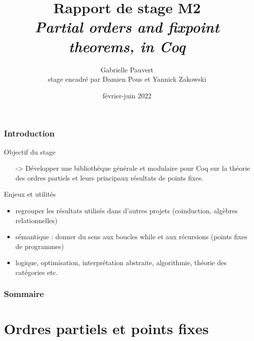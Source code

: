 \documentclass{beamer}
\title[\textit{Partial orders and fixpoint theorems, in Coq} ~~~~~~~~~~~~~~~~~~~~~ \insertframenumber]{Rapport de stage M2 \\
\textit{Partial orders and fixpoint theorems, in Coq}}
\date{février-juin 2022}
\author[Gabrielle Pauvert]{Gabrielle Pauvert\\
stage encadré par Damien Pous et Yannick Zakowski}
\begin{document}
\begin{frame}
\titlepage
\end{frame}



\begin{frame}
\frametitle{Introduction}

\begin{block}{Objectif du stage}
\begin{itemize}
\item[->] Développer une bibliothèque générale et modulaire pour Coq sur la théorie des ordres partiels et leurs principaux résultats de points fixes.
\end{itemize}
\end{block}

\begin{exampleblock}{Enjeux et utilités}
\begin{itemize}
\item regrouper les résultats utilisés dans d'autres projets (coinduction, algèbres relationnelles)
\item sémantique : donner du sens aux boucles while et aux récursions (points fixes de programmes)
\item logique, optimisation, interprétation abstraite, algorithmie, théorie des catégories etc.
\end{itemize}
\end{exampleblock}

\end{frame}


\begin{frame}
\frametitle{Sommaire}
\small{\tableofcontents}
\end{frame}





\section{Ordres partiels et points fixes}
\end{document}

